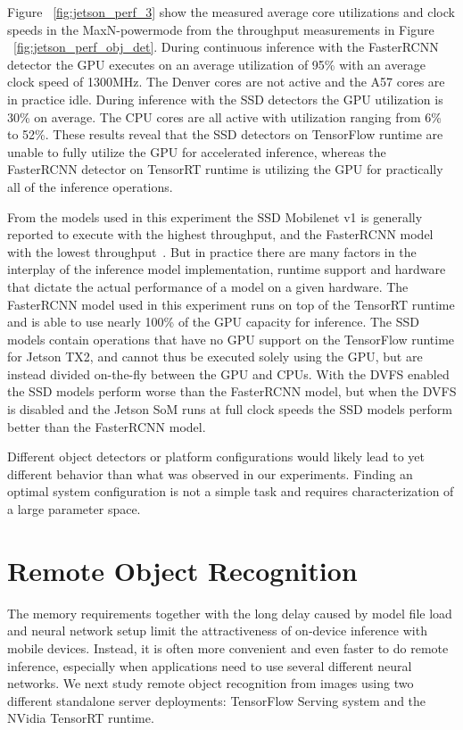 \documentclass[sigconf]{acmart}
\begin{document}
Figure ~\ref{fig:jetson_perf_3} show the measured average core utilizations and clock speeds in the MaxN-powermode from the throughput measurements in Figure ~\ref{fig:jetson_perf_obj_det}. During continuous inference with the FasterRCNN detector the GPU executes on an average utilization of 95\% with an average clock speed of 1300MHz. The Denver cores are not active and the A57 cores are in practice idle. During inference with the SSD detectors the GPU utilization is 30\% on average. The CPU cores are all active with utilization ranging from 6\% to 52\%. These results reveal that the SSD detectors on TensorFlow runtime are unable to fully utilize the GPU for accelerated inference, whereas the FasterRCNN detector on TensorRT runtime is utilizing the GPU for practically all of the inference operations.

From the models used in this experiment the SSD Mobilenet v1 is generally reported to execute with the highest throughput, and the FasterRCNN model with the lowest throughput~\cite{Huang2017CVPR}. But in practice there are many factors in the interplay of the inference model implementation, runtime support and hardware that dictate the actual performance of a model on a given hardware. The FasterRCNN model used in this experiment runs on top of the TensorRT runtime and is able to use nearly 100\% of the GPU capacity for inference. The SSD models contain operations that have no GPU support on the TensorFlow runtime for Jetson TX2, and cannot thus be executed solely using the GPU, but are instead divided on-the-fly between the GPU and CPUs. With the DVFS enabled the SSD models perform worse than the FasterRCNN model, but when the DVFS is disabled and the Jetson SoM runs at full clock speeds the SSD models perform better than the FasterRCNN model.

Different object detectors or platform configurations would likely lead to yet different behavior than what was observed in our experiments. Finding an optimal system configuration is not a simple task and requires characterization of a large parameter space.


\section{Remote Object Recognition}\label{sec:remote}

The memory requirements together with the long delay caused by model file load and neural network setup limit the attractiveness of on-device inference with mobile devices. Instead, it is often more convenient and even faster to do remote inference, especially when applications need to use several different neural networks. We next study remote object recognition from images using two different standalone server deployments: TensorFlow Serving system and the NVidia TensorRT runtime.
\end{document}

